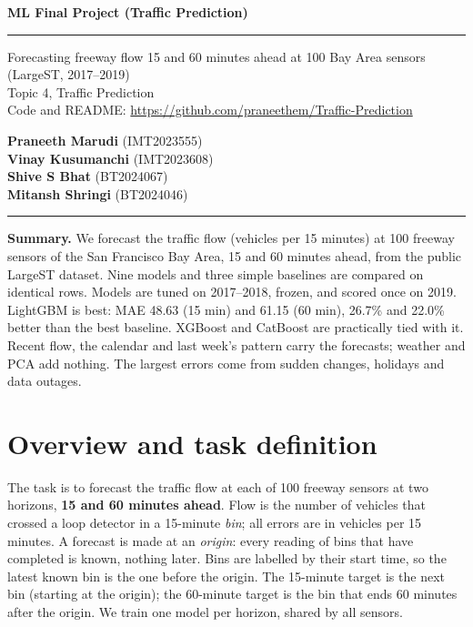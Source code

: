 ﻿\documentclass[11pt,a4paper]{article}
\begin{document}
\thispagestyle{empty}
\begin{center}
{\fontsize{24}{28}\selectfont\bfseries\color{ink} ML Final Project (Traffic Prediction)}
\end{center}
\vspace{-2pt}
{\color{accent}\rule{\linewidth}{1.2pt}}
\vspace{4pt}

\noindent
\begin{minipage}[b]{0.55\linewidth}
{\large\color{mute} Forecasting freeway flow 15 and 60 minutes ahead at 100 Bay Area sensors (LargeST, 2017--2019)}\\[6pt]
{\small Topic 4, Traffic Prediction\\
Code and README: \url{https://github.com/praneethem/Traffic-Prediction}}
\end{minipage}\hfill
\begin{minipage}[b]{0.40\linewidth}\raggedleft
\textbf{Praneeth Marudi} (IMT2023555)\\[2pt]
\textbf{Vinay Kusumanchi} (IMT2023608)\\[2pt]
\textbf{Shive S Bhat} (BT2024067)\\[2pt]
\textbf{Mitansh Shringi} (BT2024046)
\end{minipage}

\vspace{6pt}
{\color{accent}\rule{\linewidth}{0.5pt}}
\vspace{6pt}

\noindent\textbf{\color{accent}Summary.} We forecast the traffic flow (vehicles per 15 minutes) at 100 freeway sensors of the San Francisco Bay Area,
15 and 60 minutes ahead, from the public LargeST dataset. Nine models and three simple baselines are compared on identical rows.
Models are tuned on 2017--2018, frozen, and scored once on 2019. LightGBM is best: MAE 48.63 (15 min) and 61.15 (60 min),
26.7\% and 22.0\% better than the best baseline. XGBoost and CatBoost are practically tied with it. Recent flow, the calendar and
last week's pattern carry the forecasts; weather and PCA add nothing. The largest errors come from sudden changes, holidays and
data outages.

\section{Overview and task definition}
The task is to forecast the traffic flow at each of 100 freeway sensors at two horizons, \textbf{15 and 60 minutes ahead}.
Flow is the number of vehicles that crossed a loop detector in a 15-minute \emph{bin}; all errors are in vehicles per 15 minutes.
A forecast is made at an \emph{origin}: every reading of bins that have completed is known, nothing later.
Bins are labelled by their start time, so the latest known bin is the one before the origin. The 15-minute target is the next bin
(starting at the origin); the 60-minute target is the bin that ends 60 minutes after the origin. We train one model per horizon,
shared by all sensors.
\end{document}
